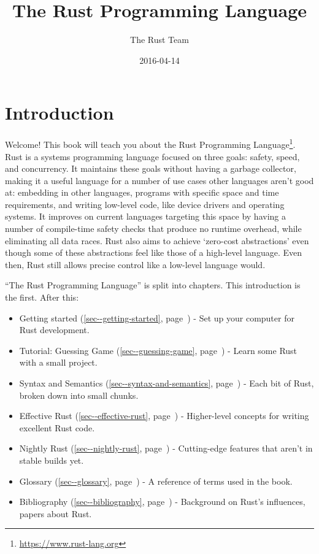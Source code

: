 \documentclass[a4paper,]{book}
\title{The Rust Programming Language}
\author{The Rust Team}
\date{2016-04-14}
\renewcommand*{\hyperref}[2][\ar]{%
  \def\ar{#2}%
  #2 (\autoref{#1}, page~\pageref{#1})}
\renewcommand{\href}[2]{#2\footnote{\url{#1}}}
\begin{document}
  \maketitle



{
  \hypersetup{linkcolor=black}
  \setcounter{tocdepth}{2}
  \tableofcontents
  \newpage
}

\chapter{Introduction}\label{introduction}

Welcome! This book will teach you about the
\href{https://www.rust-lang.org}{Rust Programming Language}. Rust is a
systems programming language focused on three goals: safety, speed, and
concurrency. It maintains these goals without having a garbage
collector, making it a useful language for a number of use cases other
languages aren't good at: embedding in other languages, programs with
specific space and time requirements, and writing low-level code, like
device drivers and operating systems. It improves on current languages
targeting this space by having a number of compile-time safety checks
that produce no runtime overhead, while eliminating all data races. Rust
also aims to achieve `zero-cost abstractions' even though some of these
abstractions feel like those of a high-level language. Even then, Rust
still allows precise control like a low-level language would.

``The Rust Programming Language'' is split into chapters. This
introduction is the first. After this:

\begin{itemize}
\itemsep1pt\parskip0pt
\item
  \hyperref[sec--getting-started]{Getting started} - Set up your
  computer for Rust development.
\item
  \hyperref[sec--guessing-game]{Tutorial: Guessing Game} - Learn some
  Rust with a small project.
\item
  \hyperref[sec--syntax-and-semantics]{Syntax and Semantics} - Each bit
  of Rust, broken down into small chunks.
\item
  \hyperref[sec--effective-rust]{Effective Rust} - Higher-level concepts
  for writing excellent Rust code.
\item
  \hyperref[sec--nightly-rust]{Nightly Rust} - Cutting-edge features
  that aren't in stable builds yet.
\item
  \hyperref[sec--glossary]{Glossary} - A reference of terms used in the
  book.
\item
  \hyperref[sec--bibliography]{Bibliography} - Background on Rust's
  influences, papers about Rust.
\end{itemize}
\end{document}
